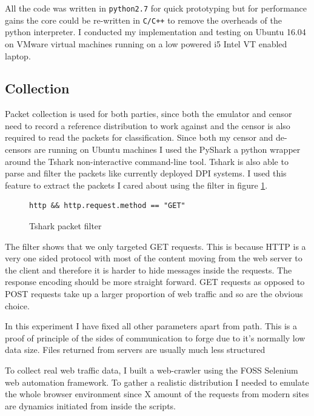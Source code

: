 \documentclass[10pt,a4paper]{article}
\begin{document}
All the code was written in \texttt{python2.7} for quick prototyping but for performance gains the core could be re-written in \texttt{C/C++} to remove the overheads of the python interpreter. I conducted my implementation and testing on Ubuntu 16.04 on VMware virtual machines running on a low powered i5 Intel VT enabled laptop.

\subsection{Collection}

Packet collection is used for both parties, since both the emulator and censor need to record a reference distribution to work against and the censor is also required to read the packets for classification. Since both my censor and de-censors are running on Ubuntu machines I used the PyShark a python wrapper around the Tshark non-interactive command-line tool. Tshark is also able to parse and filter the packets like currently deployed DPI systems. I used this feature to extract the packets I cared about using the filter in figure \ref{fig:filter}.

\begin{figure}[h]
\begin{verbatim}
http && http.request.method == "GET"
\end{verbatim}
\caption{Tshark packet filter}
\label{fig:filter}
\end{figure}

The filter shows that we only targeted GET requests. This is because HTTP is a very one sided protocol with most of the content moving from the web server to the client and therefore it is harder to hide messages inside the requests. The response encoding should be more straight forward. GET requests as opposed to POST requests take up a larger proportion of web traffic and so are the obvious choice. 

In this experiment I have fixed all other parameters apart from path. This is a proof of principle
of the sides of communication to forge due to it's normally low data size. Files returned from servers are usually much less structured 

To collect real web traffic data, I built a web-crawler using the FOSS Selenium web automation framework. To gather a realistic distribution I needed to emulate the whole browser environment since X amount of the requests from modern sites are dynamics initiated from inside the scripts.
\end{document}
